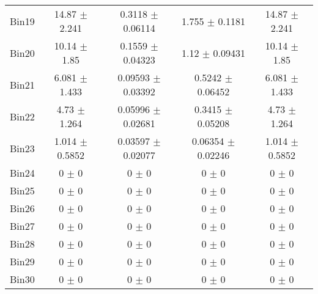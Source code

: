 \begin{tabular}{@{\extracolsep{4pt}}lcccc@{}}
     Bin19 & 14.87 $\pm$ 2.241 & 0.3118 $\pm$ 0.06114 & 1.755 $\pm$ 0.1181 & 14.87 $\pm$ 2.241 \\ 
     Bin20 & 10.14 $\pm$ 1.85 & 0.1559 $\pm$ 0.04323 & 1.12 $\pm$ 0.09431 & 10.14 $\pm$ 1.85 \\ 
     Bin21 & 6.081 $\pm$ 1.433 & 0.09593 $\pm$ 0.03392 & 0.5242 $\pm$ 0.06452 & 6.081 $\pm$ 1.433 \\ 
     Bin22 & 4.73 $\pm$ 1.264 & 0.05996 $\pm$ 0.02681 & 0.3415 $\pm$ 0.05208 & 4.73 $\pm$ 1.264 \\ 
     Bin23 & 1.014 $\pm$ 0.5852 & 0.03597 $\pm$ 0.02077 & 0.06354 $\pm$ 0.02246 & 1.014 $\pm$ 0.5852 \\ 
     Bin24 & 0 $\pm$ 0 & 0 $\pm$ 0 & 0 $\pm$ 0 & 0 $\pm$ 0 \\ 
     Bin25 & 0 $\pm$ 0 & 0 $\pm$ 0 & 0 $\pm$ 0 & 0 $\pm$ 0 \\ 
     Bin26 & 0 $\pm$ 0 & 0 $\pm$ 0 & 0 $\pm$ 0 & 0 $\pm$ 0 \\ 
     Bin27 & 0 $\pm$ 0 & 0 $\pm$ 0 & 0 $\pm$ 0 & 0 $\pm$ 0 \\ 
     Bin28 & 0 $\pm$ 0 & 0 $\pm$ 0 & 0 $\pm$ 0 & 0 $\pm$ 0 \\ 
     Bin29 & 0 $\pm$ 0 & 0 $\pm$ 0 & 0 $\pm$ 0 & 0 $\pm$ 0 \\ 
     Bin30 & 0 $\pm$ 0 & 0 $\pm$ 0 & 0 $\pm$ 0 & 0 $\pm$ 0 \\ 
\hline\hline
  \end{tabular}
